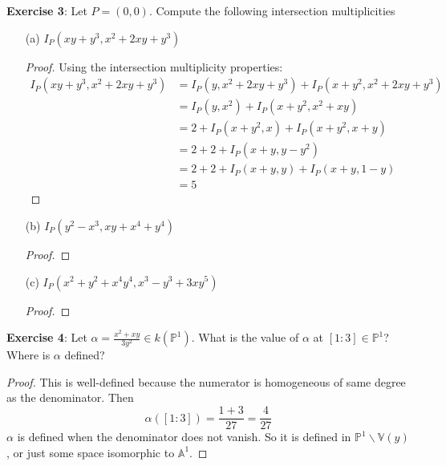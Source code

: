 \documentclass{article}
\begin{document}
\textbf{Exercise 3}: Let $P = (0, 0)$. Compute the following intersection multiplicities
    \begin{itemize}
        \item [(a)] $I_{P}(xy + y^{3}, x^{2} + 2xy + y^{3})$
            \begin{proof}
                Using the intersection multiplicity properties:
                    \begin{align*}
                        I_{P}(xy + y^{3}, x^{2} + 2xy + y^{3}) &= I_{P}(y, x^{2} + 2xy + y^{3}) + I_{P}(x + y^{2}, x^{2} + 2xy + y^{3}) \\
                         &= I_{P}(y, x^{2}) + I_{P}(x + y^{2}, x^{2} + xy) \\
                         &= 2 + I_{P}(x + y^{2}, x) + I_{P}(x + y^{2}, x + y) \\
                         &= 2 + 2 + I_{P}(x + y, y - y^{2}) \\
                         &= 2 + 2 + I_{P}(x + y, y) + I_{P}(x + y, 1 - y) \\
                         &= 5   
                    \end{align*}
            \end{proof}

        \item [(b)] $I_{P}(y^{2} - x^{3}, xy + x^{4} + y^{4})$
            \begin{proof}
            \end{proof}

        \item [(c)] $I_{P}(x^{2} + y^{2} + x^{4}y^{4}, x^{3} - y^{3} + 3xy^{5})$ 
            \begin{proof}
            \end{proof}
    \end{itemize}

\textbf{Exercise 4}: Let $\alpha = \frac{x^{2} + xy}{3y^{2}} \in k(\mathbb{P}^{1})$. What is the value of $\alpha$ at $[1 : 3] \in\mathbb{P}^{1}$? Where is $\alpha$ defined?
    \begin{proof}
        This is well-defined because the numerator is homogeneous of same degree as the denominator. Then
            \begin{equation*}
                \alpha([1 : 3]) = \dfrac{1 + 3}{27} = \dfrac{4}{27}
            \end{equation*}
        $\alpha$ is defined when the denominator does not vanish. So it is defined in $\mathbb{P}^{1} \backslash \mathbb{V}(y)$, or just some space isomorphic to $\mathbb{A}^{1}$.
    \end{proof}
\end{document}
